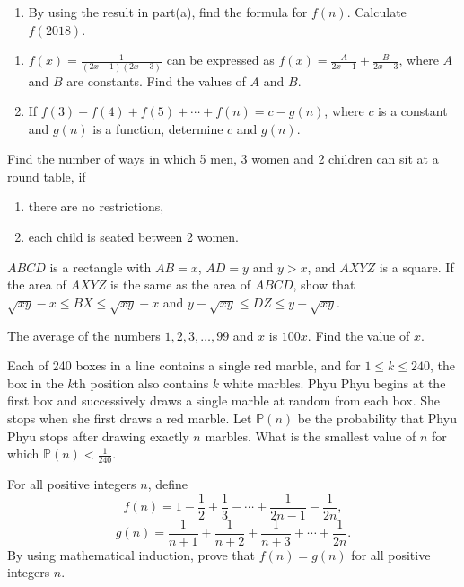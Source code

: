 \begin{problems}
\begin{enumerate}
        \item By using the result in part(a), find the formula for $f(n)$.
            Calculate $f(2018)$. 
    \end{enumerate}
    
    \problem \begin{enumerate}
        \item $f(x) = \frac{1}{(2x - 1)(2x - 3)}$ can be expressed as $f(x) =
            \frac{A}{2x - 1}+\frac{B}{2x - 3}$, where $A$ and $B$ are
            constants. Find the values of $A$ and $B$. 
        
        \item If $f(3) + f(4) + f(5) + \cdots + f(n) = c - g(n)$, where $c$ is
            a constant and $g(n)$ is a function, determine $c$ and $g(n)$. 
    \end{enumerate}
    
    \problem Find the number of ways in which 5 men, 3 women and 2 children can
    sit at a round table, if 
    \begin{enumerate}
        \item there are no restrictions,
        
        \item each child is seated between 2 women.
    \end{enumerate}
    
    \problem $ABCD$ is a rectangle with $AB = x$, $AD = y$ and $y > x$, and
    $AXYZ$ is a square. If the area of $AXYZ$ is the same as the area of
    $ABCD$, show that $\sqrt{xy} - x\leq BX\leq \sqrt{xy} + x$ and $y -
    \sqrt{xy} \leq DZ\leq y + \sqrt{xy}$. 
    
    \problem The average of the numbers $1, 2, 3, \ldots, 99$ and $x$ is
    $100x$. Find the value of $x$. 
    
    \problem Each of 240 boxes in a line contains a single red marble, and for
    $1 \leq k \leq 240$, the box in the $k$th position also contains $k$ white
    marbles. Phyu Phyu begins at the first box and successively draws a single
    marble at random from each box. She stops when she first draws a red
    marble. Let $\mathbb{P}(n)$ be the probability that Phyu Phyu stops after
    drawing exactly $n$ marbles. What is the smallest value of $n$ for which
    $\mathbb{P}(n) < \frac{1}{240}$. 
    
    \problem For all positive integers $n$, define 
    \[f(n) = 1 - \frac{1}{2} + \frac{1}{3} - \cdots + \frac{1}{2n-1} -
    \frac{1}{2n},\]
    \[g(n) = \frac{1}{n + 1} + \frac{1}{n + 2} + \frac{1}{n + 3} + \cdots +
    \frac{1}{2n}.\]
    By using mathematical induction, prove that $f(n) = g(n)$ for all positive
    integers $n$. 
    

\end{problems}
